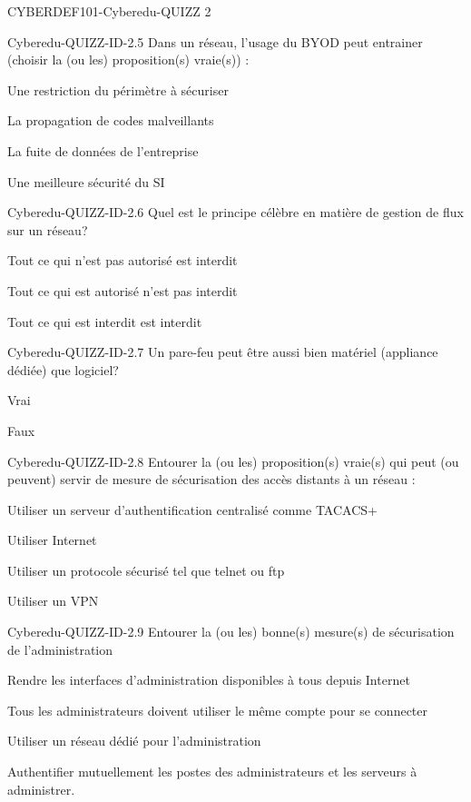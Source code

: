 \documentclass[12pt]{article}
\begin{document}
\begin{quiz}{CYBERDEF101-Cyberedu-QUIZZ 2}
\begin{multi}[multiple=true]{Cyberedu-QUIZZ-ID-2.5}
	Dans un r\'eseau, l'usage du BYOD peut entrainer (choisir la (ou les) proposition(s) vraie(s)) :
\item Une restriction du p\'erim\`etre \`{a} s\'ecuriser
\item* La propagation de codes malveillants
\item* La fuite de donn\'ees de l'entreprise
\item Une meilleure s\'ecurit\'e du SI
\end{multi}

\begin{multi}[multiple=true]{Cyberedu-QUIZZ-ID-2.6}
	Quel est le principe c\'el\`ebre en mati\`ere de gestion de flux sur un r\'eseau?
\item* Tout ce qui n'est pas autoris\'e est interdit
\item Tout ce qui est autoris\'e n'est pas interdit
\item Tout ce qui est interdit est interdit
\end{multi}

\begin{multi}[multiple=true]{Cyberedu-QUIZZ-ID-2.7}
	Un  pare-feu  peut \^etre aussi bien mat\'eriel (appliance d\'edi\'ee) que logiciel?
\item* Vrai
\item Faux
\end{multi}

\begin{multi}[multiple=true]{Cyberedu-QUIZZ-ID-2.8}
	Entourer la (ou les) proposition(s) vraie(s) qui peut (ou peuvent) servir de mesure de s\'ecurisation des acc\`es distants \`{a} un r\'eseau :
\item* Utiliser un serveur d'authentification centralis\'e comme TACACS+
\item Utiliser Internet
\item Utiliser un protocole s\'ecuris\'e tel que telnet ou ftp
\item* Utiliser un VPN
\end{multi}

\begin{multi}[multiple=true]{Cyberedu-QUIZZ-ID-2.9}
	Entourer la (ou les) bonne(s) mesure(s) de s\'ecurisation de l'administration
\item Rendre les interfaces d'administration disponibles \`{a} tous depuis Internet
\item Tous les administrateurs doivent utiliser le m\^eme compte pour se connecter
\item* Utiliser un r\'eseau d\'edi\'e pour l'administration
\item* Authentifier mutuellement les postes des administrateurs et les serveurs \`{a} administrer.
\end{multi}


\end{quiz}
\end{document}
